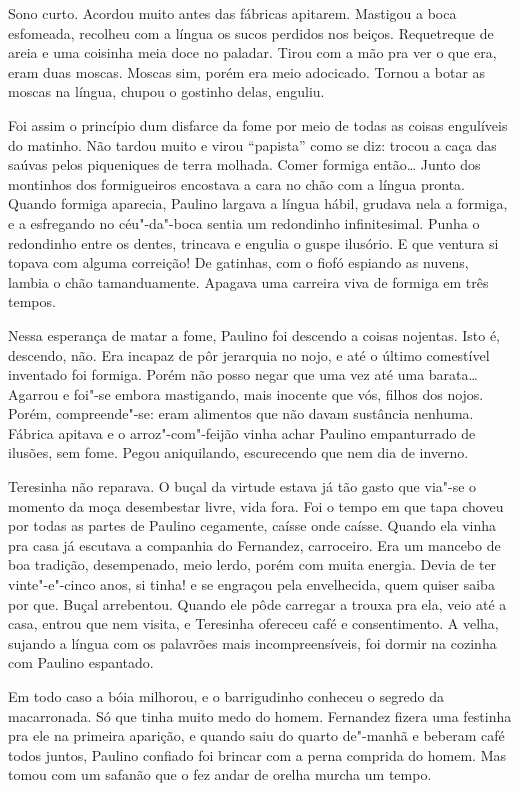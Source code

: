 Sono curto. Acordou muito antes das fábricas apitarem. Mastigou a boca
esfomeada, recolheu com a língua os sucos perdidos nos beiços.
Requetreque de areia e uma coisinha meia doce no paladar. Tirou com a
mão pra ver o que era, eram duas moscas. Moscas sim, porém era meio
adocicado. Tornou a botar as moscas na língua, chupou o gostinho delas,
enguliu.

Foi assim o princípio dum disfarce da fome por meio de todas as coisas
engulíveis do matinho. Não tardou muito e virou ``papista'' como se diz:
trocou a caça das saúvas pelos piqueniques de terra molhada. Comer
formiga então\ldots{} Junto dos montinhos dos formigueiros encostava a cara
no chão com a língua pronta. Quando formiga aparecia, Paulino largava a
língua hábil, grudava nela a formiga, e a esfregando no céu"-da"-boca
sentia um redondinho infinitesimal. Punha o redondinho entre os dentes,
trincava e engulia o guspe ilusório. E que ventura si topava com alguma
correição! De gatinhas, com o fiofó espiando as nuvens, lambia o chão
tamanduamente. Apagava uma carreira viva de formiga em três tempos.

Nessa esperança de matar a fome, Paulino foi descendo a coisas nojentas.
Isto é, descendo, não. Era incapaz de pôr jerarquia no nojo, e até o
último comestível inventado foi formiga. Porém não posso negar que uma
vez até uma barata\ldots{} Agarrou e foi"-se embora mastigando, mais inocente
que vós, filhos dos nojos. Porém, compreende"-se: eram alimentos que não
davam sustância nenhuma. Fábrica apitava e o arroz"-com"-feijão vinha
achar Paulino empanturrado de ilusões, sem fome. Pegou aniquilando,
escurecendo que nem dia de inverno.

Teresinha não reparava. O buçal da virtude estava já tão gasto que
via"-se o momento da moça desembestar livre, vida fora. Foi o tempo em
que tapa choveu por todas as partes de Paulino cegamente, caísse onde
caísse. Quando ela vinha pra casa já escutava a companhia do Fernandez,
carroceiro. Era um mancebo de boa tradição, desempenado, meio lerdo,
porém com muita energia. Devia de ter vinte"-e"-cinco anos, si tinha! e se
engraçou pela envelhecida, quem quiser saiba por que. Buçal arrebentou.
Quando ele pôde carregar a trouxa pra ela, veio até a casa, entrou que
nem visita, e Teresinha ofereceu café e consentimento. A velha, sujando
a língua com os palavrões mais incompreensíveis, foi dormir na cozinha
com Paulino espantado.

Em todo caso a bóia milhorou, e o barrigudinho conheceu o segredo da
macarronada. Só que tinha muito medo do homem. Fernandez fizera uma
festinha pra ele na primeira aparição, e quando saiu do quarto de"-manhã
e beberam café todos juntos, Paulino confiado foi brincar com a perna
comprida do homem. Mas tomou com um safanão que o fez andar de orelha
murcha um tempo.


